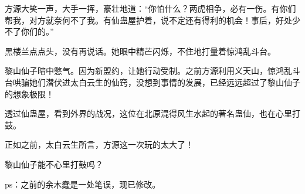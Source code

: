 \begin{this_body}
方源大笑一声，大手一挥，豪壮地道：“你怕什么？两虎相争，必有一伤。有你们帮我，对方就奈何不了我。有仙蛊屋护着，说不定还有得利的机会！事后，好处少不了你们的。”

黑楼兰点点头，没有再说话。她眼中精芒闪烁，不住地打量着惊鸿乱斗台。

黎山仙子暗中憋气。因为新盟约，让她行动受制。之前方源利用义天山，惊鸿乱斗台哄骗她们潜伏进太白云生的仙窍，没想到事情的发展，已经远远超过了黎山仙子的想象极限！

透过仙蛊屋，看到外界的战况，这位在北原混得风生水起的著名蛊仙，也在心里打鼓。

正如之前，太白云生所言，方源这一次玩的太大了！

黎山仙子能不心里打鼓吗？

ps：之前的余木蠢是一处笔误，现已修改。

\end{this_body}

